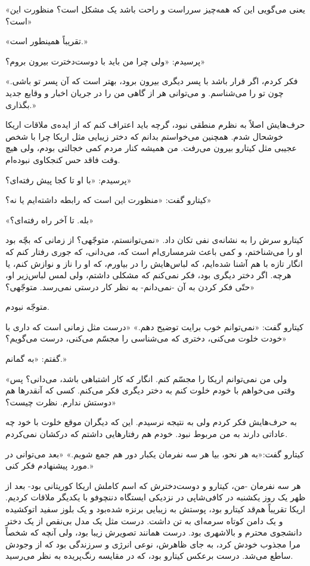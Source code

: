 \documentclass[a5paper]{book}
\begin{document}
«یعنی می‌گویی این که همه‌چیز سرراست و راحت باشد یک مشکل است؟ منظورت این است؟»

«تقریباً همینطور است.»

پرسیدم: «ولی چرا من باید با دوست‌دخترت بیرون بروم؟»

«فکر کردم، اگر قرار باشد با پسر دیگری بیرون برود، بهتر است که آن پسر تو باشی. چون تو را می‌شناسم. و می‌توانی هر از گاهی من را در جریان اخبار و وقایع جدید بگذاری.»

حرف‌هایش اصلاً به نظرم منطقی نبود، گرچه باید اعتراف کنم که از ایده‌ی ملاقات اریکا خوشحال شدم. همچنین می‌خواستم بدانم که دختر زیبایی مثل اریکا چرا با شخص عجیبی مثل کیتارو بیرون می‌رفت. من همیشه کنار مردم کمی خجالتی بودم، ولی هیچ وقت فاقد حس کنجکاوی نبوده‌ام.

پرسیدم: «با او تا کجا پیش رفته‌ای؟»

کیتارو گفت: «منظورت این است که رابطه داشته‌ایم یا نه؟»

«بله. تا آخر راه رفته‌ای؟»

کیتارو سرش را به نشانه‌ی نفی تکان داد. «نمی‌توانستم، متوجّهی؟ از زمانی که بچّه بود او را می‌شناختم، و کمی باعث شرمساری‌ام است که، می‌دانی، که جوری رفتار کنم که انگار تازه با هم آشنا شده‌ایم، که لباس‌هایش را در بیاورم، که او را ناز و نوازش کنم، یا هرچه. اگر دختر دیگری بود، فکر نمی‌کنم که مشکلی داشتم، ولی لمس لباس‌زیر او، حتّی فکر کردن به آن -نمی‌دانم- به نظر کار درستی نمی‌رسد. متوجّهی؟»

متوجّه نبودم.

کیتارو گفت: «نمی‌توانم خوب برایت توضیح دهم.» «درست مثل زمانی است که داری با خودت خلوت می‌کنی، دختری که می‌شناسی را مجسّم می‌کنی، درست می‌گویم؟»

گفتم: «به گمانم.»

«ولی من نمی‌توانم اریکا را مجسّم کنم. انگار که کار اشتباهی باشد، می‌دانی؟ پس وقتی می‌خواهم با خودم خلوت کنم به دختر دیگری فکر می‌کنم. کسی که آنقدرها هم دوستش ندارم. نظرت چیست؟»

به حرف‌هایش فکر کردم ولی به نتیجه نرسیدم. این که دیگران موقع خلوت با خود چه عاداتی دارند به من مربوط نبود. خودم هم رفتارهایی داشتم که درکشان نمی‌کردم.

کیتارو گفت:«به هر نحو، بیا هر سه نفرمان یکبار دور هم جمع شویم.» «بعد می‌توانی در مورد پیشنهادم فکر کنی.»

هر سه نفرمان -من، کیتارو و دوست‌دخترش که اسم کاملش اریکا کوریتانی بود- بعد از ظهر یک روز یکشنبه در کافی‌شاپی در نزدیکی ایستگاه دننچوفو با یکدیگر ملاقات کردیم. اریکا تقریباً هم‌قد کیتارو بود، پوستش به زیبایی برنزه شده‌بود و یک بلوز سفید اتوکشیده و یک دامن کوتاه سرمه‌ای به تن داشت. درست مثل یک مدل بی‌نقص از یک دختر دانشجوی محترم و بالاشهری بود. درست همانند تصویرش زیبا بود، ولی آنچه که شخصاً مرا مجذوب خودش کرد، به جای ظاهرش، نوعی انرژی و سرزندگی بود که از وجودش ساطع می‌شد. درست برعکس کیتارو بود، که در مقایسه رنگ‌پریده به نظر می‌رسید.
\end{document}
